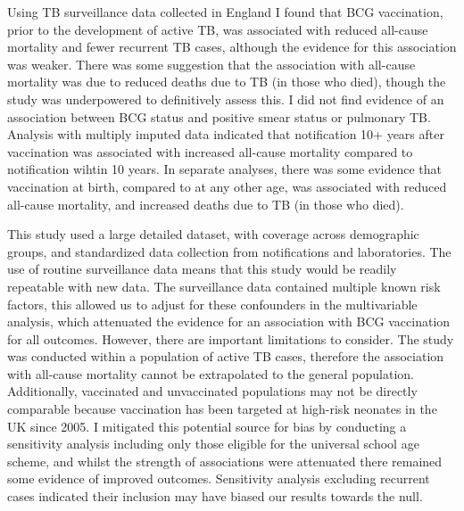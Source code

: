 \documentclass[11pt,twoside]{bristolthesis}
\begin{document}
  Using TB surveillance data collected in England I found that BCG vaccination, prior to the development of active TB, was associated with reduced all-cause mortality and fewer recurrent TB cases, although the evidence for this association was weaker. There was some suggestion that the association with all-cause mortality was due to reduced deaths due to TB (in those who died), though the study was underpowered to definitively assess this. I did not find evidence of an association between BCG status and positive smear status or pulmonary TB. Analysis with multiply imputed data indicated that notification 10+ years after vaccination was associated with increased all-cause mortality compared to notification wihtin 10 years. In separate analyses, there was some evidence that vaccination at birth, compared to at any other age, was associated with reduced all-cause mortality, and increased deaths due to TB (in those who died).
  
  This study used a large detailed dataset, with coverage across demographic groups, and standardized data collection from notifications and laboratories. The use of routine surveillance data means that this study would be readily repeatable with new data. The surveillance data contained multiple known risk factors, this allowed us to adjust for these confounders in the multivariable analysis, which attenuated the evidence for an association with BCG vaccination for all outcomes. However, there are important limitations to consider. The study was conducted within a population of active TB cases, therefore the association with all-cause mortality cannot be extrapolated to the general population. Additionally, vaccinated and unvaccinated populations may not be directly comparable because vaccination has been targeted at high-risk neonates in the UK since 2005. I mitigated this potential source for bias by conducting a sensitivity analysis including only those eligible for the universal school age scheme, and whilst the strength of associations were attenuated there remained some evidence of improved outcomes. Sensitivity analysis excluding recurrent cases indicated their inclusion may have biased our results towards the null.
  
\end{document}
